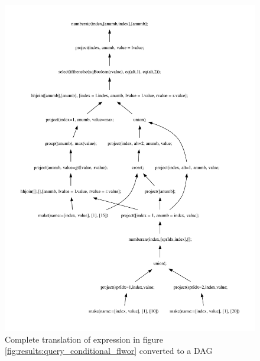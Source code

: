 \newpage
\begin{figure}[!htp]
\begin{center} 
  \includegraphics[width=1.0\textwidth]{img/graphs/td_impl_flwor_ifthenelse_xq_relalg_dag}
  \caption{Complete translation of expression in figure
  \ref{fig:results:query_conditional_flwor} converted to a DAG}
  \label{fig:results:query_conditional_flwor_result_dag}
\end{center}
\end{figure}